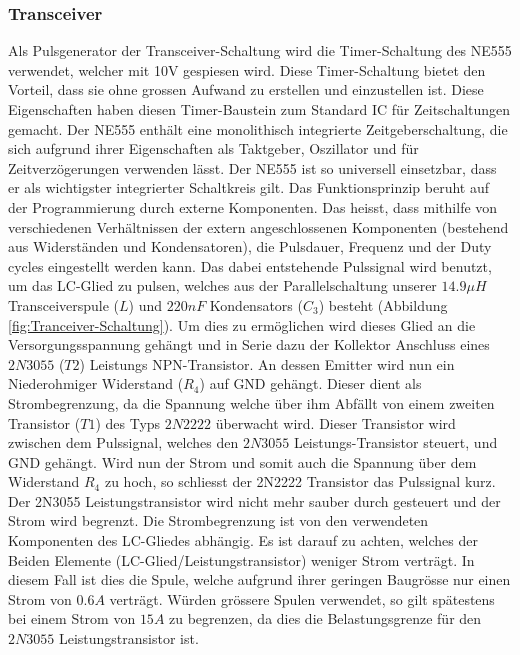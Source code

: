 \subsubsection*{Transceiver}
Als Pulsgenerator der Transceiver-Schaltung wird die Timer-Schaltung des NE555 verwendet, welcher mit 10V gespiesen wird. Diese Timer-Schaltung bietet den Vorteil, dass sie ohne grossen Aufwand zu erstellen und  einzustellen ist. Diese Eigenschaften haben diesen Timer-Baustein zum Standard IC für Zeitschaltungen gemacht. Der NE555 enthält eine monolithisch integrierte Zeitgeberschaltung, die sich aufgrund ihrer Eigenschaften als Taktgeber, Oszillator und für Zeitverzögerungen verwenden lässt. Der NE555 ist so universell einsetzbar, dass er als wichtigster integrierter Schaltkreis gilt. Das Funktionsprinzip beruht auf der Programmierung durch externe Komponenten. Das heisst, dass mithilfe von verschiedenen Verhältnissen der extern angeschlossenen Komponenten (bestehend aus Widerständen und Kondensatoren), die Pulsdauer, Frequenz und der Duty cycles eingestellt werden kann. Das dabei entstehende Pulssignal wird benutzt, um das LC-Glied zu pulsen, welches aus der Parallelschaltung unserer $14.9 \mu H$  Transceiverspule ($L$) und $220 nF$ Kondensators ($C_{3}$) besteht (Abbildung \ref{fig:Tranceiver-Schaltung}). Um dies zu ermöglichen wird dieses Glied an die Versorgungsspannung gehängt und in Serie dazu der Kollektor Anschluss eines $2N3055$ ($T2$) Leistungs NPN-Transistor. An dessen Emitter wird nun ein Niederohmiger Widerstand ($R_{4}$) auf GND gehängt. Dieser dient als Strombegrenzung, da die Spannung welche über ihm Abfällt von einem zweiten Transistor ($T1$) des Typs $2N2222$ überwacht wird. Dieser Transistor wird zwischen dem Pulssignal, welches den $2N3055$ Leistungs-Transistor steuert, und GND gehängt. Wird nun der Strom und somit auch die Spannung über dem Widerstand $R_{4}$ zu hoch, so schliesst der 2N2222 Transistor das Pulssignal kurz. Der 2N3055 Leistungstransistor wird nicht mehr sauber durch gesteuert und der Strom wird begrenzt. Die Strombegrenzung ist von den verwendeten Komponenten des LC-Gliedes abhängig. Es ist darauf zu achten, welches der Beiden Elemente (LC-Glied/Leistungstransistor) weniger Strom verträgt. In diesem Fall ist dies die Spule, welche aufgrund ihrer geringen Baugrösse nur einen Strom von $0.6A$ verträgt. Würden grössere Spulen verwendet, so gilt spätestens bei einem Strom von $15A$ zu begrenzen, da dies die Belastungsgrenze für den $2N3055$ Leistungstransistor ist.   


